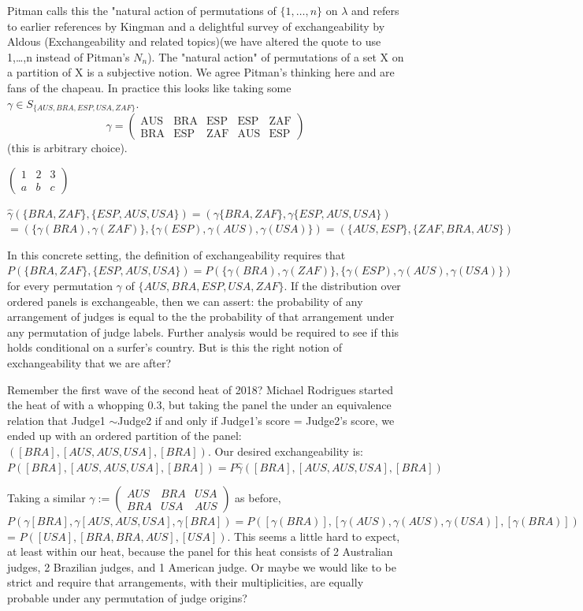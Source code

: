 \documentclass{article}
\theoremstyle{definition}
\begin{document}
Pitman calls this the "natural action of permutations of $\{1,…,n\}$  on $\lambda$ and refers to earlier references by Kingman and a delightful survey of exchangeability by Aldous (Exchangeability and related topics)(we have altered the quote to use {1,…,n} instead of Pitman's $N_n$). The "natural action" of permutations of a set X on a partition of X is a subjective notion. We agree Pitman's thinking here and are fans of the chapeau. 
In practice this looks like taking some $\gamma \in S_{\{AUS,BRA,ESP,USA,ZAF\}}$. 
\[\gamma=
\begin{pmatrix} 
\text{AUS} & \text{BRA} & \text{ESP} & \text{ESP} & \text{ZAF}\\
\text{BRA}  & \text{ESP} & \text{ZAF} & \text{AUS} & \text{ESP}
\end{pmatrix}
\] (this is arbitrary choice). 

\(
\begin{pmatrix}
1 & 2 & 3\\
a & b & c
\end{pmatrix}
\)

$ \hat{\gamma}(\{BRA, ZAF\},\{ESP, AUS, USA\}) =(\gamma\{BRA, ZAF\},\gamma\{ESP, AUS, USA\}) $
$ =(\{\gamma(BRA),\gamma(ZAF)\},\{\gamma(ESP),\gamma(AUS),\gamma(USA)\}) = (\{AUS, ESP\},\{ZAF, BRA, AUS\}) $

In this concrete setting, the definition of exchangeability requires that $P(\{BRA,ZAF\},\{ESP,AUS,USA\}) = P(\{\gamma(BRA),\gamma(ZAF)\},\{\gamma(ESP),\gamma(AUS),\gamma(USA)\})$ for every permutation $\gamma$ of $\{AUS,BRA,ESP,USA,ZAF\}$. If the distribution over ordered panels is exchangeable, then we can assert: the probability of any arrangement of judges is equal to the the probability of that arrangement under any permutation of judge labels. Further analysis would be required to see if this holds conditional on a surfer's country. But is this the right notion of exchangeability that we are after?

Remember the first wave of the second heat of 2018? Michael Rodrigues started the heat of with a whopping 0.3, but taking the panel the under an equivalence relation that Judge1 $\sim$Judge2 if and only if Judge1's score = Judge2's score, we ended up with an ordered partition of the panel: $([BRA],[AUS,AUS,USA],[BRA])$. Our desired exchangeability is: $P([BRA],[AUS,AUS,USA],[BRA]) = P\hat{\gamma}([BRA],[AUS,AUS,USA],[BRA])$

Taking a similar $\gamma:=\begin{pmatrix} AUS & BRA & USA \\ BRA & USA & AUS \end{pmatrix}$ as before, $P(\gamma[BRA],\gamma[AUS,AUS,USA],\gamma[BRA])= P([\gamma(BRA)],[\gamma(AUS),\gamma(AUS),\gamma(USA)],[\gamma(BRA)])$ = $P([USA],[BRA,BRA,AUS],[USA])$. This seems a little hard to expect, at least within our heat, because the panel for this heat consists of 2 Australian judges, 2 Brazilian judges, and 1 American judge. Or maybe we would like to be strict and require that arrangements, with their multiplicities, are equally probable under any permutation of judge origins?
\end{document}
